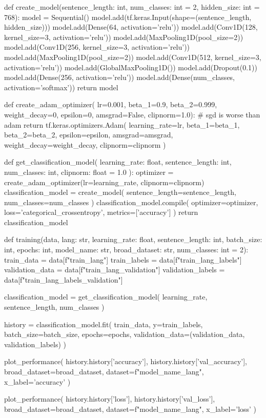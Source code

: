 \begin{python}
def create_model(sentence_length: int, num_classes: int = 2,
                 hidden_size: int = 768):
  model = Sequential()
  model.add(tf.keras.Input(shape=(sentence_length, hidden_size)))
  model.add(Dense(64, activation='relu'))
  model.add(Conv1D(128, kernel_size=3, activation='relu'))
  model.add(MaxPooling1D(pool_size=2))
  model.add(Conv1D(256, kernel_size=3, activation='relu'))
  model.add(MaxPooling1D(pool_size=2))
  model.add(Conv1D(512, kernel_size=3, activation='relu'))
  model.add(GlobalMaxPooling1D())
  model.add(Dropout(0.1))
  model.add(Dense(256, activation='relu'))
  model.add(Dense(num_classes, activation='softmax'))
  return model


def create_adam_optimizer(
    lr=0.001, beta_1=0.9, beta_2=0.999, weight_decay=0,
    epsilon=0, amsgrad=False, clipnorm=1.0):
  # sgd is worse than adam
  return tf.keras.optimizers.Adam(
    learning_rate=lr, beta_1=beta_1,
    beta_2=beta_2, epsilon=epsilon,
    amsgrad=amsgrad, weight_decay=weight_decay, clipnorm=clipnorm
  )


def get_classification_model(
    learning_rate: float, sentence_length: int,
    num_classes: int, clipnorm: float = 1.0
):
  optimizer = create_adam_optimizer(lr=learning_rate, clipnorm=clipnorm)
  classification_model = create_model(
    sentence_length=sentence_length, num_classes=num_classes
  )
  classification_model.compile(
    optimizer=optimizer,
    loss='categorical_crossentropy',
    metrics=['accuracy']
  )
  return classification_model


def training(data, lang: str, learning_rate: float, sentence_length: int,
             batch_size: int, epochs: int,
             model_name: str, broad_dataset: str, num_classes: int = 2):
  train_data = data[f"train_{lang}"]
  train_labels = data[f"train_{lang}_labels"]
  validation_data = data[f"train_{lang}_validation"]
  validation_labels = data[f"train_{lang}_labels_validation"]

  classification_model = get_classification_model(
    learning_rate, sentence_length, num_classes
  )

  history = classification_model.fit(
    train_data,
    y=train_labels,
    batch_size=batch_size,
    epochs=epochs,
    validation_data=(validation_data, validation_labels)
  )

  plot_performance(
    history.history['accuracy'],
    history.history['val_accuracy'],
    broad_dataset=broad_dataset,
    dataset=f"{model_name}_{lang}",
    x_label='accuracy'
  )

  plot_performance(
    history.history['loss'],
    history.history['val_loss'],
    broad_dataset=broad_dataset,
    dataset=f"{model_name}_{lang}",
    x_label='loss'
  )


\end{python}
